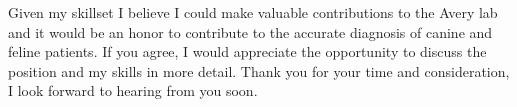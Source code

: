 \documentclass[11pt,a4paper,sans]{moderncv}
\begin{document}
\begin{spacing}{1.1}
Given my skillset I believe I could make valuable contributions to the Avery lab and it would be an honor to contribute to the accurate diagnosis of canine and feline patients. 
If you agree, I would appreciate the opportunity to discuss the position and my skills in more detail. 
Thank you for your time and consideration, I look forward to hearing from you soon.


 

\end{spacing}
\makeletterclosing
\end{document}
